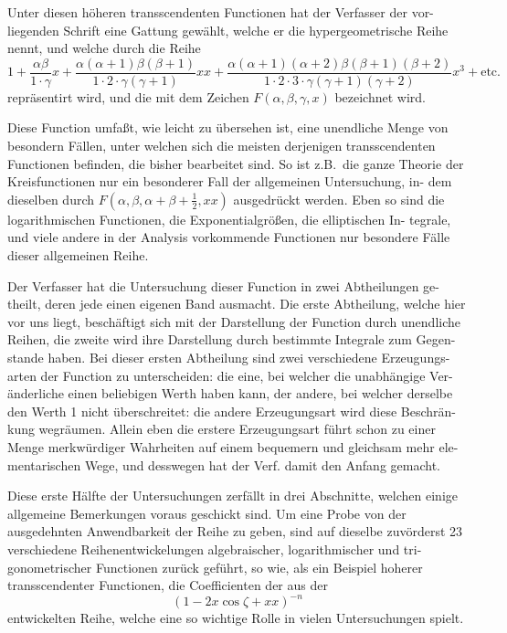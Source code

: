 \documentclass[12pt,a4paper]{article}
\begin{document}
Unter diesen höheren transscendenten Functionen hat der Verfasser der vor-
liegenden Schrift eine Gattung gewählt, welche er die hypergeometrische Reihe
nennt, und welche durch die Reihe
\[
1 + \frac{\alpha \beta}{1 \cdot \gamma} x + \frac{\alpha(\alpha+1) \beta(\beta+1)}{1 \cdot 2 \cdot \gamma(\gamma+1)} xx + \frac{\alpha(\alpha+1)(\alpha+2) \beta(\beta+1)(\beta+2)}{1 \cdot 2 \cdot 3 \cdot \gamma(\gamma+1)(\gamma+2)} x^3 + \text{etc.}
\]
repräsentirt wird, und die mit dem Zeichen $F(\alpha, \beta, \gamma, x)$ bezeichnet wird.

Diese Function umfaßt, wie leicht zu übersehen ist, eine unendliche Menge
von besondern Fällen, unter welchen sich die meisten derjenigen transscendenten
Functionen befinden, die bisher bearbeitet sind. So ist z.B.\ die ganze Theorie
der Kreisfunctionen nur ein besonderer Fall der allgemeinen Untersuchung, in-
dem dieselben durch $F(\alpha, \beta, \alpha+\beta+\tfrac{1}{2}, xx)$ ausgedrückt werden. Eben so
sind die logarithmischen Functionen, die Exponentialgrößen, die elliptischen In-
tegrale, und viele andere in der Analysis vorkommende Functionen nur besondere
Fälle dieser allgemeinen Reihe.

Der Verfasser hat die Untersuchung dieser Function in zwei Abtheilungen ge-
theilt, deren jede einen eigenen Band ausmacht. Die erste Abtheilung, welche hier
vor uns liegt, beschäftigt sich mit der Darstellung der Function durch unendliche
Reihen, die zweite wird ihre Darstellung durch bestimmte Integrale zum Gegen-
stande haben. Bei dieser ersten Abtheilung sind zwei verschiedene Erzeugungs-
arten der Function zu unterscheiden: die eine, bei welcher die unabhängige Ver-
änderliche einen beliebigen Werth haben kann, der andere, bei welcher derselbe
den Werth 1 nicht überschreitet: die andere Erzeugungsart wird diese Beschrän-
kung wegräumen. Allein eben die erstere Erzeugungsart führt schon zu einer
Menge merkwürdiger Wahrheiten auf einem bequemern und gleichsam mehr ele-
mentarischen Wege, und desswegen hat der Verf. damit den Anfang gemacht.

Diese erste Hälfte der Untersuchungen zerfällt in drei Abschnitte, welchen
einige allgemeine Bemerkungen voraus geschickt sind. Um eine Probe von der
ausgedehnten Anwendbarkeit der Reihe zu geben, sind auf dieselbe zuvörderst
23 verschiedene Reihenentwickelungen algebraischer, logarithmischer und tri-
gonometrischer Functionen zurück geführt, so wie, als ein Beispiel hoherer
transscendenter Functionen, die Coefficienten der aus der
\[
(1 - 2x \cos \zeta + xx)^{-n}
\]
entwickelten Reihe, welche eine so wichtige Rolle in vielen Untersuchungen spielt.
\end{document}
